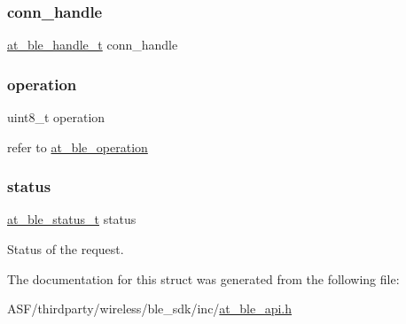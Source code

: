 \subsubsection{\texorpdfstring{conn\_handle}{conn\_handle}}
{\footnotesize\ttfamily \mbox{\hyperlink{at__ble__api_8h_abd23646d0c662860741f787efc8456f2}{at\+\_\+ble\+\_\+handle\+\_\+t}} conn\+\_\+handle}

\mbox{\label{structat__ble__cmd__complete__event__t_a97d486d6926f9137837e1d8ecf0bbfdd}} 
\subsubsection{\texorpdfstring{operation}{operation}}
{\footnotesize\ttfamily uint8\+\_\+t operation}



refer to \mbox{\hyperlink{at__ble__api_8h_a9660b10ef751ef8858a2c291518031a6}{at\+\_\+ble\+\_\+operation}} 

\mbox{\label{structat__ble__cmd__complete__event__t_a0b48093fc2030779fc47e5216f8019e2}} 
\subsubsection{\texorpdfstring{status}{status}}
{\footnotesize\ttfamily \mbox{\hyperlink{group__error__codes__group_ga3b1db9b95feb157b3c188ca27fe76988}{at\+\_\+ble\+\_\+status\+\_\+t}} status}



Status of the request. 



The documentation for this struct was generated from the following file\+:\begin{DoxyCompactItemize}
\item 
A\+S\+F/thirdparty/wireless/ble\+\_\+sdk/inc/\mbox{\hyperlink{at__ble__api_8h}{at\+\_\+ble\+\_\+api.\+h}}\end{DoxyCompactItemize}
